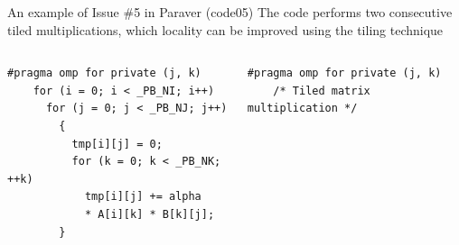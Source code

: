 \documentclass[10pt,xcolor=table]{beamer}
\begin{document}
\begin{frame}[fragile]{An example of Issue \#5 in Paraver (code05)}
The code performs two consecutive tiled multiplications, which locality can be improved using the tiling technique
\begin{columns}
\begin{column}{0.5\textwidth}
\begin{lstlisting}[style=shell,basicstyle=\scriptsize\ttfamily,gobble=3,caption={Regular matrix multiplication}]
    #pragma omp for private (j, k)
    for (i = 0; i < _PB_NI; i++)
      for (j = 0; j < _PB_NJ; j++)
        {
          tmp[i][j] = 0;
          for (k = 0; k < _PB_NK; ++k)
            tmp[i][j] += alpha 
            * A[i][k] * B[k][j];
        }

  \end{lstlisting}
  \end{column}
\begin{column}{0.5\textwidth}
  \begin{lstlisting}[style=shell,gobble=3,basicstyle=\scriptsize\ttfamily,caption={Tiled matrix multiplication}]
    #pragma omp for private (j, k)
    /* Tiled matrix multiplication */
  \end{lstlisting}
  \end{column}
  \end{columns}
\end{frame}
\end{document}
